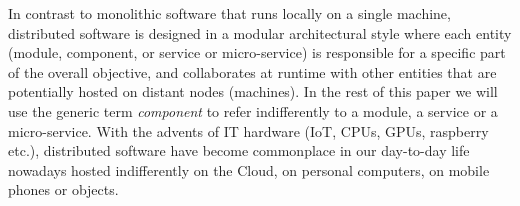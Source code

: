 %


In contrast to monolithic software that runs locally on a single machine, distributed software is designed in a modular architectural style where each entity (\ie module, component, or service or micro-service) is responsible for a specific part of the overall objective, and collaborates at runtime with other entities that are potentially hosted on distant nodes (\ie machines). In the rest of this paper we will use the generic term \emph{component} to refer indifferently to a module, a service or a micro-service. With the advents of IT hardware (IoT, CPUs, GPUs, raspberry etc.), distributed software have become commonplace in our day-to-day life nowadays hosted indifferently on the Cloud, on personal computers, on mobile phones or objects. 

